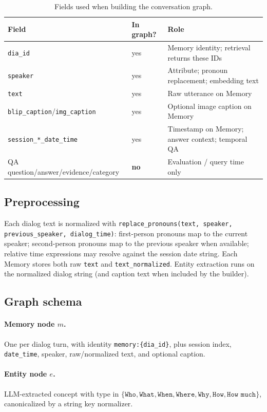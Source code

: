 \documentclass[11pt]{article}
\begin{document}
\begin{table}[t]
\centering
\small
\caption{Fields used when building the conversation graph.}
\label{tab:fields}
\begin{tabular}{llp{6.2cm}}
\toprule
Field & In graph? & Role \\
\midrule
\texttt{dia\_id} & yes & Memory identity; retrieval returns these IDs \\
\texttt{speaker} & yes & Attribute; pronoun replacement; embedding text \\
\texttt{text} & yes & Raw utterance on Memory \\
\texttt{blip\_caption}/\texttt{img\_caption} & yes & Optional image caption on Memory \\
\texttt{session\_*\_date\_time} & yes & Timestamp on Memory; answer context; temporal QA \\
QA question/answer/evidence/category & \textbf{no} & Evaluation / query time only \\
\bottomrule
\end{tabular}
\end{table}

\subsection{Preprocessing}
\label{sec:prep}

Each dialog text is normalized with \texttt{replace\_pronouns(text, speaker, previous\_speaker, dialog\_time)}:
first-person pronouns map to the current speaker; second-person pronouns map to the previous speaker when available; relative time expressions may resolve against the session date string.
Each Memory stores both raw \texttt{text} and \texttt{text\_normalized}.
Entity extraction runs on the normalized dialog string (and caption text when included by the builder).

\subsection{Graph schema}
\label{sec:schema}

\paragraph{Memory node $m$.}
One per dialog turn, with identity \texttt{memory:\{dia\_id\}}, plus session index, \texttt{date\_time}, speaker, raw/normalized text, and optional caption.

\paragraph{Entity node $e$.}
LLM-extracted concept with type in
$\{\texttt{Who},\texttt{What},\texttt{When},\texttt{Where},\texttt{Why},\texttt{How},\texttt{How much}\}$,
canonicalized by a string key normalizer.
\end{document}
